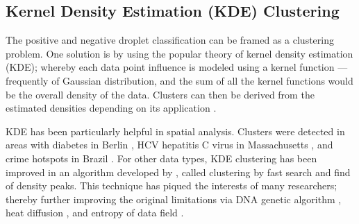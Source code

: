 \subsection{Kernel Density Estimation (KDE) Clustering}
\label{sec:peakdetectionkde}
The positive and negative droplet classification can be framed as a clustering problem. One solution is by using the popular theory of kernel density estimation (KDE); whereby each data point influence is modeled using a kernel function — frequently of Gaussian distribution, and the sum of all the kernel functions would be the overall density of the data. Clusters can then be derived from the estimated densities depending on its application \cite{Hinneburg2003}.

KDE has been particularly helpful in spatial analysis. Clusters were detected in areas with diabetes in Berlin \cite{Kauhl2016}, HCV hepatitis C virus in Massachusetts \cite{Stopka2017}, and crime hotspots in Brazil \cite{Junior2019}. For other data types, KDE clustering has been improved in an algorithm developed by , called clustering by fast search and find of density peaks. This technique has piqued the interests of many researchers; thereby further improving the original limitations via DNA genetic algorithm \cite{Zang2017}, heat diffusion \cite{Mehmood2016}, and entropy of data field \cite{Wang2016}.  

